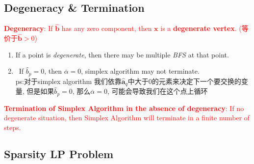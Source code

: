 \documentclass[9pt]{article}
\begin{document}
\subsection{Degeneracy \& Termination}

\textcolor{red}{\textbf{Degeneracy}: If $\widehat{\mathbf{b}}$ has any zero component, then $\mathbf{x}$ is a \textbf{degenerate vertex}. (等价于$\widehat{\mathbf{b}}>0$)}

\begin{enumerate}[itemsep=-2pt, topsep=-2pt]
    \item If a point is \textit{degenerate}, then there may be multiple \textit{BFS} at that point.
    \item \star \ If $\widehat{b}_p=0$, then $\overline{\alpha}=0$, simplex algorithm may not terminate. \\ {\scriptsize ps:对于simplex algorithm 我们依靠$\widehat{\mathbf{a}}_q$中大于0的元素来决定下一个要交换的变量, 但是如果$\widehat{b}_p=0$, 那么$\overline{\alpha}=0$, 可能会导致我们在这个点上循环}
\end{enumerate}

\textcolor{red}{\textbf{Termination of Simplex Algorithm in the absence of degeneracy}: If no degenerate situation, then Simplex Algorithm will terminate in a finite number of steps.}



\newpage


\subsection{Sparsity LP Problem}
\end{document}
